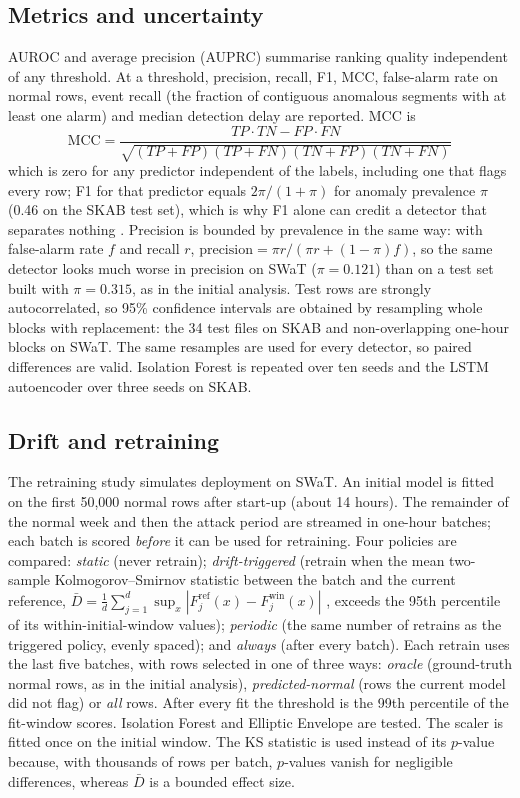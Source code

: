 \documentclass[11pt]{article}
\begin{document}
\subsection{Metrics and uncertainty}
AUROC and average precision (AUPRC) summarise ranking quality independent of
any threshold. At a threshold, precision, recall, F1, MCC, false-alarm rate on
normal rows, event recall (the fraction of contiguous anomalous segments with at
least one alarm) and median detection delay are reported. MCC is
\begin{equation}
\mathrm{MCC}=\frac{TP\cdot TN-FP\cdot FN}{\sqrt{(TP+FP)(TP+FN)(TN+FP)(TN+FN)}}
\end{equation}
which is zero for any predictor independent of the labels, including one that
flags every row; F1 for that predictor equals $2\pi/(1+\pi)$ for anomaly
prevalence $\pi$ (0.46 on the SKAB test set), which is why F1 alone can credit
a detector that separates nothing \citep{chicco2020}. Precision is bounded by
prevalence in the same way: with false-alarm rate $f$ and recall $r$,
$\mathrm{precision}=\pi r/(\pi r+(1-\pi)f)$, so the same detector looks much
worse in precision on SWaT ($\pi{=}0.121$) than on a test set built with
$\pi{=}0.315$, as in the initial analysis.
Test rows are strongly autocorrelated, so 95\% confidence intervals are
obtained by resampling whole blocks with replacement: the 34 test files on SKAB
and non-overlapping one-hour blocks on SWaT. The same resamples are used for
every detector, so paired differences are valid. Isolation Forest is repeated
over ten seeds and the LSTM autoencoder over three seeds on SKAB.

\subsection{Drift and retraining}
The retraining study simulates deployment on SWaT. An initial model is fitted
on the first 50{,}000 normal rows after start-up (about 14 hours). The
remainder of the normal week and then the attack period are streamed in
one-hour batches; each batch is scored \emph{before} it can be used for
retraining. Four policies are compared: \emph{static} (never retrain);
\emph{drift-triggered} (retrain when the mean two-sample Kolmogorov--Smirnov
statistic between the batch and the current reference,
$\bar D=\frac{1}{d}\sum_{j=1}^{d}\sup_x\left|F^{\mathrm{ref}}_j(x)-F^{\mathrm{win}}_j(x)\right|$
\citep{massey1951}, exceeds the 95th percentile of its within-initial-window
values); \emph{periodic} (the same number of retrains as the triggered policy,
evenly spaced); and \emph{always} (after every batch). Each retrain uses the
last five batches, with rows selected in one of three ways: \emph{oracle}
(ground-truth normal rows, as in the initial analysis), \emph{predicted-normal}
(rows the current model did not flag) or \emph{all} rows. After every fit the
threshold is the 99th percentile of the fit-window scores. Isolation Forest and
Elliptic Envelope are tested. The scaler is fitted once on the initial window.
The KS statistic is used instead of its $p$-value because, with thousands of
rows per batch, $p$-values vanish for negligible differences, whereas $\bar D$
is a bounded effect size.
\end{document}
